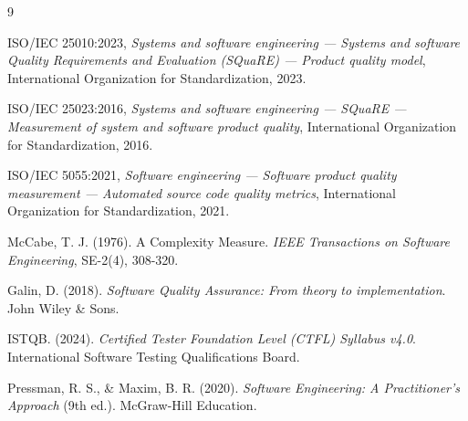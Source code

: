 \documentclass[12pt, letterpaper]{article}
\begin{document}
\begin{thebibliography}{9}

ISO/IEC 25010:2023, \textit{Systems and software engineering --- Systems and software Quality Requirements and Evaluation (SQuaRE) --- Product quality model}, International Organization for Standardization, 2023.

ISO/IEC 25023:2016, \textit{Systems and software engineering --- SQuaRE --- Measurement of system and software product quality}, International Organization for Standardization, 2016.

ISO/IEC 5055:2021, \textit{Software engineering --- Software product quality measurement --- Automated source code quality metrics}, International Organization for Standardization, 2021.

McCabe, T. J. (1976). A Complexity Measure. \textit{IEEE Transactions on Software Engineering}, SE-2(4), 308-320.

Galin, D. (2018). \textit{Software Quality Assurance: From theory to implementation}. John Wiley \& Sons.

ISTQB. (2024). \textit{Certified Tester Foundation Level (CTFL) Syllabus v4.0}. International Software Testing Qualifications Board.

Pressman, R. S., \& Maxim, B. R. (2020). \textit{Software Engineering: A Practitioner's Approach} (9th ed.). McGraw-Hill Education.

\end{thebibliography}
\end{document}
